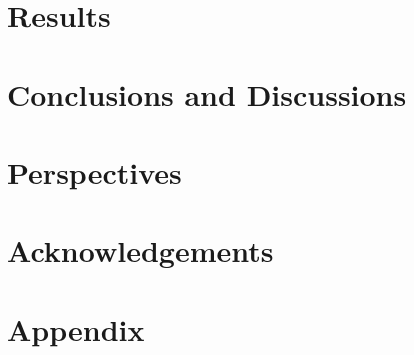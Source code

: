 \documentclass[paper=a4, fontsize=11pt]{article}
\begin{document}
\section{Results}


\section{Conclusions and Discussions}

\section{Perspectives}

\section{Acknowledgements}


\clearpage
\section{Appendix}

\clearpage
\printbibliography[
heading=bibintoc,
title={References}
]
\end{document}
